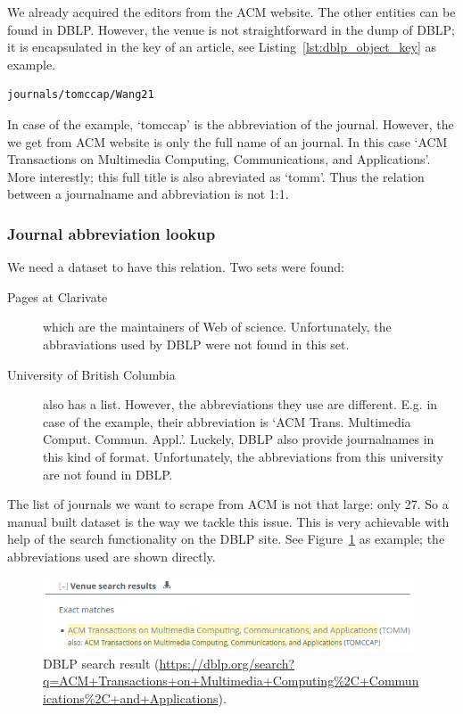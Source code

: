 \documentclass{ou-report}
\begin{document}
We already acquired the editors from the ACM website. The other entities can be 
found in DBLP. 
However, the venue is not straightforward in the dump of DBLP; it is 
encapsulated in the key of an article, see Listing~\ref{lst:dblp_object_key} 
as example.

\lstset{language=XML}
\begin{lstlisting}[caption={Example DBLP key},label={lst:dblp_object_key}]
journals/tomccap/Wang21
\end{lstlisting}

In case of the example, `tomccap' is the abbreviation of the journal. However, 
the we get from ACM website is only the full name of an journal. In this case
`ACM Transactions on Multimedia Computing, Communications, and Applications'.
More interestly; this full title is also abreviated as `tomm'. Thus the relation
between a journalname and abbreviation is not 1:1.

\subsubsection{Journal abbreviation lookup}
We need a dataset to have this relation. Two sets were found:
\begin{description}
    \item[Pages at Clarivate] which are the maintainers of Web of science. 
    Unfortunately, the abbraviations used by DBLP were not found in this set.
    \item[University of British Columbia] also has a list. However, the 
    abbreviations they use are different. E.g. in case of the example, their
    abbreviation is `ACM Trans. Multimedia Comput. Commun. Appl.'. Luckely, DBLP
    also provide journalnames in this kind of format. Unfortunately, the 
    abbreviations from this university are not found in DBLP.
\end{description}
The list of journals we want to scrape from ACM is not that large: only 27. So
a manual built dataset is the way we tackle this issue. This is very achievable 
with help of the search functionality on the DBLP site. See 
Figure~\ref{fig:dblp_search_result} as example; the abbreviations used are shown 
directly.
\begin{figure}[H]
\centering
\includegraphics[width=11cm]{images/dblp_search_result.png}
\caption{DBLP search result (\url{https://dblp.org/search?q=ACM+Transactions+on+Multimedia+Computing\%2C+Communications\%2C+and+Applications}).}
\label{fig:dblp_search_result}
\end{figure}
\end{document}
